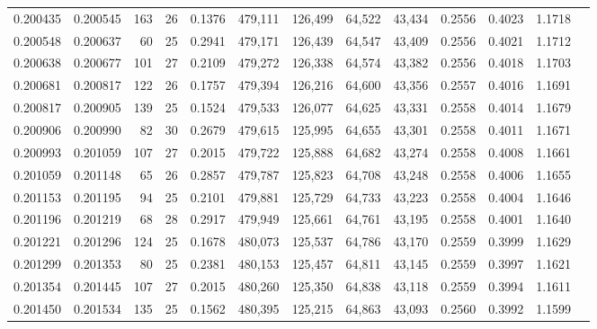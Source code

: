 \begin{tabular}{rrrrrrrrrrrrr}
0.200435 & 0.200545 & 163 &  26 &                                     0.1376 & 479,111 & 126,499 &  64,522 &  43,434 & 0.2556 & 0.4023 & 1.1718 \\
0.200548 & 0.200637 &  60 &  25 &                                     0.2941 & 479,171 & 126,439 &  64,547 &  43,409 & 0.2556 & 0.4021 & 1.1712 \\
0.200638 & 0.200677 & 101 &  27 &                                     0.2109 & 479,272 & 126,338 &  64,574 &  43,382 & 0.2556 & 0.4018 & 1.1703 \\
0.200681 & 0.200817 & 122 &  26 &                                     0.1757 & 479,394 & 126,216 &  64,600 &  43,356 & 0.2557 & 0.4016 & 1.1691 \\
0.200817 & 0.200905 & 139 &  25 &                                     0.1524 & 479,533 & 126,077 &  64,625 &  43,331 & 0.2558 & 0.4014 & 1.1679 \\
0.200906 & 0.200990 &  82 &  30 &                                     0.2679 & 479,615 & 125,995 &  64,655 &  43,301 & 0.2558 & 0.4011 & 1.1671 \\
0.200993 & 0.201059 & 107 &  27 &                                     0.2015 & 479,722 & 125,888 &  64,682 &  43,274 & 0.2558 & 0.4008 & 1.1661 \\
0.201059 & 0.201148 &  65 &  26 &                                     0.2857 & 479,787 & 125,823 &  64,708 &  43,248 & 0.2558 & 0.4006 & 1.1655 \\
0.201153 & 0.201195 &  94 &  25 &                                     0.2101 & 479,881 & 125,729 &  64,733 &  43,223 & 0.2558 & 0.4004 & 1.1646 \\
0.201196 & 0.201219 &  68 &  28 &                                     0.2917 & 479,949 & 125,661 &  64,761 &  43,195 & 0.2558 & 0.4001 & 1.1640 \\
0.201221 & 0.201296 & 124 &  25 &                                     0.1678 & 480,073 & 125,537 &  64,786 &  43,170 & 0.2559 & 0.3999 & 1.1629 \\
0.201299 & 0.201353 &  80 &  25 &                                     0.2381 & 480,153 & 125,457 &  64,811 &  43,145 & 0.2559 & 0.3997 & 1.1621 \\
0.201354 & 0.201445 & 107 &  27 &                                     0.2015 & 480,260 & 125,350 &  64,838 &  43,118 & 0.2559 & 0.3994 & 1.1611 \\
0.201450 & 0.201534 & 135 &  25 &                                     0.1562 & 480,395 & 125,215 &  64,863 &  43,093 & 0.2560 & 0.3992 & 1.1599 \\

\end{tabular}
